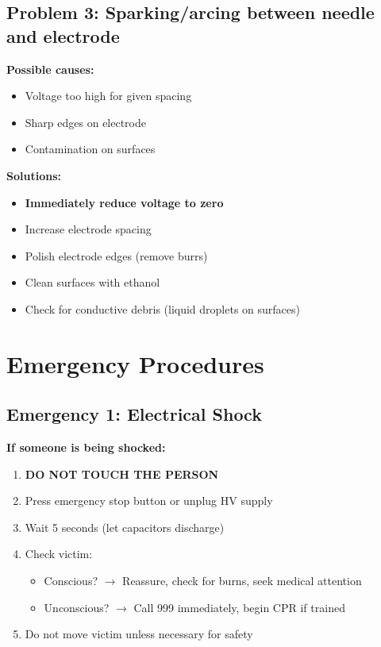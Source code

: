 \documentclass[11pt]{article}
\begin{document}
\subsection{Problem 3: Sparking/arcing between needle and electrode}

\textbf{Possible causes:}
\begin{itemize}
\item Voltage too high for given spacing
\item Sharp edges on electrode
\item Contamination on surfaces
\end{itemize}

\textbf{Solutions:}
\begin{itemize}
\item \textbf{Immediately reduce voltage to zero}
\item Increase electrode spacing
\item Polish electrode edges (remove burrs)
\item Clean surfaces with ethanol
\item Check for conductive debris (liquid droplets on surfaces)
\end{itemize}

\section{Emergency Procedures}

\subsection{Emergency 1: Electrical Shock}

\textbf{If someone is being shocked:}

\begin{enumerate}
\item \textbf{DO NOT TOUCH THE PERSON}
\item Press emergency stop button or unplug HV supply
\item Wait 5 seconds (let capacitors discharge)
\item Check victim:
  \begin{itemize}
  \item Conscious? $\rightarrow$ Reassure, check for burns, seek medical attention
  \item Unconscious? $\rightarrow$ Call 999 immediately, begin CPR if trained
  \end{itemize}
\item Do not move victim unless necessary for safety
\end{enumerate}
\end{document}
